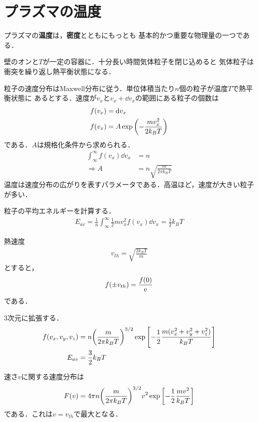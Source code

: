 \documentclass{report}
\begin{document}
\section{プラズマの温度}
プラズマの\textbf{温度}は，\textbf{密度}とともにもっとも
基本的かつ重要な物理量の一つである．

壁のオンと$T$が一定の容器に．十分長い時間気体粒子を閉じ込めると
気体粒子は衝突を繰り返し熱平衡状態になる．

粒子の速度分布はMaxwell分布に従う．単位体積当たり$n$個の粒子が温度$T$で熱平衡状態に
あるとする．速度が$v_x$と$v_x + \dd{v_x}$の範囲にある粒子の個数は
\begin{align}
  f(v_x) &= \dd{v_x}\\
  f(v_x) &= A \exp\qty(-\frac{mv_x^2}{2k_B T})
\end{align}
である．$A$は規格化条件から求められる．
\begin{align}
  \int_{\infty}^{\infty} f(v_x) \dd{v_x} &= n\\
  \Rightarrow A &= n\sqrt{\frac{m}{2\pi k_B T}}
\end{align}
温度は速度分布の広がりを表すパラメータである．高温ほど，速度が大きい粒子が多い．

粒子の平均エネルギーを計算する．
\begin{align}
  E_{av} = \frac{1}{n}\int_{\infty}^{\infty} \frac{1}{2}mv_x^2f(v_x) \dd{v_x} = \frac{1}{2}k_B T
\end{align}

熱速度
\begin{align}
  v_{th} = \sqrt{\frac{2k_B T}{m}}
\end{align}
とすると，
\begin{align}
  f(\pm v_{th}) = \frac{f(0)}{\mathrm{e}}
\end{align}
である．

3次元に拡張する．
\begin{align}
  f(v_x,v_y,v_z) &= n\qty(\frac{m}{2\pi k_B T})^{3/2} \exp\qty[-\frac{1}{2}\frac{m(v_x^2 + v_y^2 + v_z^2)}{k_B T}]\\
  E_{av} &= \frac{3}{2}k_B T
\end{align}

速さ$v$に関する速度分布は
\begin{align}
  F(v) = 4\pi n \qty(\frac{m}{2\pi k_B T})^{3/2} v^2 \exp\qty[-\frac{1}{2}\frac{mv^2}{k_B T}]
\end{align}
である．これは$v=v_{th}$で最大となる．
\end{document}
